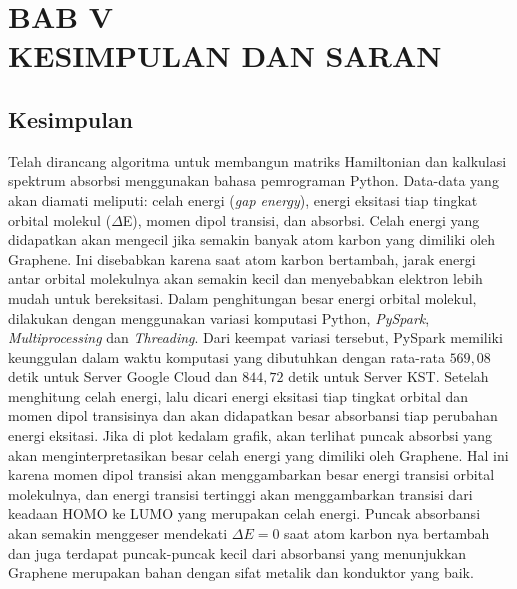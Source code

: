 \documentclass[12pt,a4paper]{report}
\begin{document}
\chapter*{BAB V \\ KESIMPULAN DAN SARAN}
\setcounter{chapter}{5}
\setcounter{section}{0}
\setcounter{figure}{0}
\thispagestyle{myplain}
\section{Kesimpulan}
	Telah dirancang algoritma untuk membangun matriks Hamiltonian dan kalkulasi spektrum absorbsi menggunakan bahasa pemrograman Python. Data-data yang akan diamati meliputi: celah energi (\textit{gap energy}), energi eksitasi tiap tingkat orbital molekul ($\Delta$E), momen dipol transisi, dan absorbsi. Celah energi yang didapatkan akan mengecil jika semakin banyak atom karbon yang dimiliki oleh Graphene. Ini disebabkan karena saat atom karbon bertambah, jarak energi antar orbital molekulnya akan semakin kecil dan menyebabkan elektron lebih mudah untuk bereksitasi. Dalam penghitungan besar energi orbital molekul, dilakukan dengan menggunakan variasi komputasi Python, \textit{PySpark}, \textit{Multiprocessing} dan \textit{Threading}. Dari keempat variasi tersebut, PySpark memiliki keunggulan dalam waktu komputasi yang dibutuhkan dengan rata-rata $569,08$ detik untuk Server Google Cloud dan $844,72$ detik untuk Server KST. Setelah menghitung celah energi, lalu dicari energi eksitasi tiap tingkat orbital dan momen dipol transisinya dan akan didapatkan besar absorbansi tiap perubahan energi eksitasi. Jika di plot kedalam grafik, akan terlihat puncak absorbsi yang akan menginterpretasikan besar celah energi yang dimiliki oleh Graphene. Hal ini karena momen dipol transisi akan menggambarkan besar energi transisi orbital molekulnya, dan energi transisi tertinggi akan menggambarkan transisi dari keadaan HOMO ke LUMO yang merupakan celah energi. Puncak absorbansi akan semakin menggeser mendekati $\Delta E = 0$ saat atom karbon nya bertambah dan juga terdapat puncak-puncak kecil dari absorbansi yang menunjukkan Graphene merupakan bahan dengan sifat metalik dan konduktor yang baik.
\end{document}
